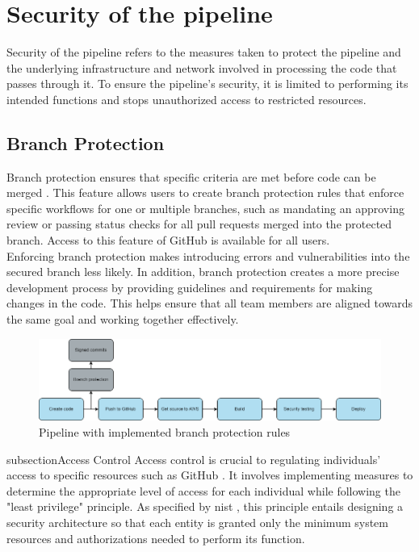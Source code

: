 \section{Security of the pipeline}
\label{Security of the pipeline}
Security of the pipeline refers to the measures taken to protect the pipeline and the underlying infrastructure and network involved in processing the code that passes through it. To ensure the pipeline's security, it is limited to performing its intended functions and stops unauthorized access to restricted resources.

\subsection{Branch Protection}
Branch protection ensures that specific criteria are met before code can be merged \cite{branch}. This feature allows users to create branch protection rules that enforce specific workflows for one or multiple branches, such as mandating an approving review or passing status checks for all pull requests merged into the protected branch. Access to this feature of GitHub is available for all users.
\\
Enforcing branch protection makes introducing errors and vulnerabilities into the secured branch less likely. In addition, branch protection creates a more precise development process by providing guidelines and requirements for making changes in the code. This helps ensure that all team members are aligned towards the same goal and working together effectively.  


\vspace{2mm}
\begin{figure}[H]
    \centering
    \includegraphics[width=0.8\columnwidth]{Images/pipeline6.png}
    \caption{Pipeline with implemented branch protection rules}
    \label{fig: Pipeline with implemented branch protection rules}
\end{figure}

subsection{Access Control}
Access control is crucial to regulating individuals' access to specific resources such as GitHub \cite{accesscontroll}. It involves implementing measures to determine the appropriate level of access for each individual while following the "least privilege" principle. As specified by \acrshort{nist} \cite{leastprivilege}, this principle entails designing a security architecture so that each entity is granted only the minimum system resources and authorizations needed to perform its function. 

